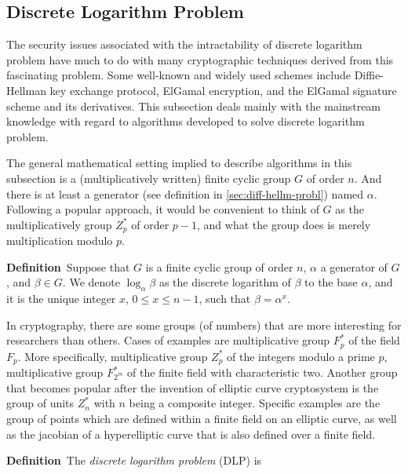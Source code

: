 \documentclass[12pt,journal,compsoc]{IEEEtran}
\begin{document}
\subsection{Discrete Logarithm Problem}
\label{sec:disctr-logar-probl}
The security issues associated with the intractability of discrete
logarithm problem have much to do with many cryptographic techniques
derived from this fascinating problem. Some well-known and widely used
schemes include Diffie-Hellman key exchange protocol, ElGamal
encryption, and the ElGamal signature scheme and its derivatives. This
subsection deals mainly with the mainstream knowledge with regard to
algorithms developed to solve discrete logarithm problem.
\par
The general mathematical setting implied to describe algorithms in
this subsection is a (multiplicatively written) finite cyclic group
$G$ of order $n$. And there is at least a generator (see definition in
\autoref{sec:diff-hellm-probl}) named $\alpha$. Following a popular
approach, it would be convenient to think of $G$ as the
multiplicatively group $Z^{*}_{p}$ of order $p-1$, and what the group
does is merely multiplication modulo $p$.
\par
\textbf{Definition}~Suppose that $G$ is a finite cyclic group of order
$n$, $\alpha$ a generator of $G$, and $\beta\in G$. We denote
$\log_{\alpha}\beta$ as the discrete logarithm of $\beta$ to the base
$\alpha$, and it is the unique integer $x$, $0\leq x\leq n-1$, such
that $\beta=\alpha^{x}$.
\par
In cryptography, there are some groups (of numbers) that are more
interesting for researchers than others. Cases of examples are
multiplicative group $F^{*}_{p}$ of the field $F_{p}$. More
specifically, multiplicative group $Z^{*}_{p}$ of the integers modulo
a prime $p$, multiplicative group $F^{*}_{2^{m}}$ of the finite field
with characteristic two. Another group that becomes popular after the
invention of elliptic curve cryptosystem is the group of units
$Z^{*}_{n}$ with $n$ being a composite integer. Specific examples are
the group of points which are defined within a finite field on an
elliptic curve, as well as the jacobian of a hyperelliptic curve that
is also defined over a finite field.
\par
\textbf{Definition}~The \emph{discrete logarithm problem} (DLP) is
\end{document}
